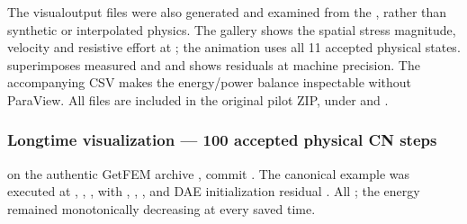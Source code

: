 \documentclass[letterpaper,10pt,english]{sphinxmanual}
\begin{document}
\sphinxAtStartPar
The visual\sphinxhyphen{}output files were also generated and
examined from the , rather than
synthetic or interpolated physics. The gallery
 shows the spatial stress
magnitude, velocity and resistive effort at
; the animation
 uses all 11 accepted physical
states.  superimposes measured
 and  and shows residuals
at machine precision. The accompanying CSV makes the
energy/power balance inspectable without ParaView.
All files are included in the original pilot ZIP,
under  and .


\subsubsection{Long\sphinxhyphen{}time visualization — 100 accepted physical CN steps}
\label{\detokenize{examples/wave_coenergy:long-time-visualization-100-accepted-physical-cn-steps}}
\sphinxAtStartPar
{} on the authentic GetFEM
archive ,
commit .
The canonical example was executed at ,
, , with ,
, , and DAE initialization
residual . All ; the energy remained monotonically
decreasing at every saved time.
\end{document}
